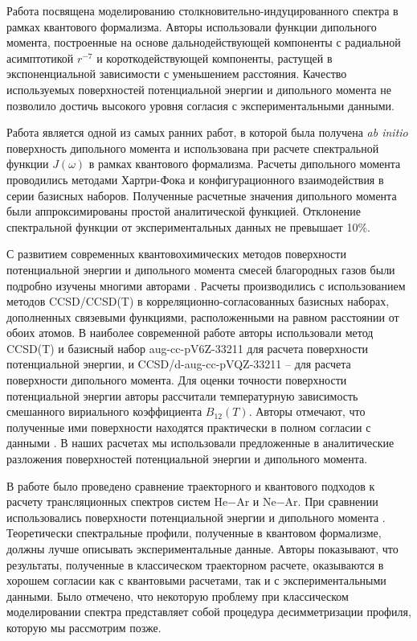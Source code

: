 Работа \cite{sharma1975} посвящена моделированию столкновительно-индуцированного спектра в рамках квантового формализма. Авторы использовали функции дипольного момента, построенные на основе дальнодействующей компоненты с радиальной асимптотикой $r^{-7}$ и короткодействующей компоненты, растущей в экспоненциальной зависимости с уменьшением расстояния. Качество используемых поверхностей потенциальной энергии и дипольного момента не позволило достичь высокого уровня согласия с экспериментальными данными. \par
Работа \cite{meyer1986} является одной из самых ранних работ, в которой была получена \textit{ab initio} поверхность дипольного момента и использована при расчете спектральной функции $J(\omega)$ в рамках квантового формализма. Расчеты дипольного момента проводились методами Хартри-Фока и конфигурационного взаимодействия в серии базисных наборов. Полученные расчетные значения дипольного момента были аппроксимированы простой аналитической функцией. Отклонение спектральной функции от экспериментальных данных не превышает 10\%. \par 
С развитием современных квантовохимических методов поверхности потенциальной энергии и дипольного момента смесей благородных газов были подробно изучены многими авторами \cite{cybulski1999, giece2003, fernandez2004}. Расчеты производились с использованием методов CCSD/CCSD(T) в корреляционно-согласованных базисных наборах, дополненных связевыми функциями, расположенными на равном расстоянии от обоих атомов. В наиболее современной работе \cite{fernandez2004} авторы использовали метод CCSD(T) и базисный набор aug-cc-pV6Z-33211 для расчета поверхности потенциальной энергии, и CCSD/d-aug-cc-pVQZ-33211 -- для расчета поверхности дипольного момента. Для оценки точности поверхности потенциальной энергии авторы рассчитали температурную зависимость смешанного вириального коэффициента $B_{12}(T)$. Авторы \cite{fernandez2004} отмечают, что полученные ими поверхности находятся практически в полном согласии с данными \cite{cybulski1999}. В наших расчетах мы использовали предложенные в \cite{fernandez2004} аналитические разложения поверхностей потенциальной энергии и дипольного момента. \par
В работе \cite{buryak2014} было проведено сравнение траекторного и квантового подходов к расчету трансляционных спектров систем He$-$Ar и Ne$-$Ar. При сравнении использовались поверхности потенциальной энергии \cite{fernandez2004} и дипольного момента \cite{fernandez2004, meyer1986}. Теоретически спектральные профили, полученные в квантовом формализме, должны лучше описывать экспериментальные данные. Авторы показывают, что результаты, полученные в классическом траекторном расчете, оказываются в хорошем согласии как с квантовыми расчетами, так и с экспериментальными данными. Было отмечено, что некоторую проблему при классическом моделировании спектра представляет собой процедура десимметризации профиля, которую мы рассмотрим позже. \par

